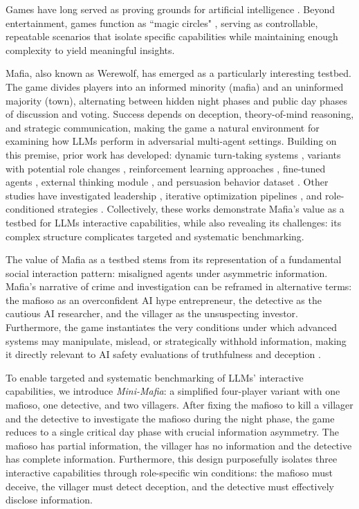 \documentclass{article}
\begin{document}
Games have long served as proving grounds for artificial intelligence \citep{silver2016mastering}. Beyond entertainment, games function as ``magic circles" \citep{huizinga1938homo}, serving as controllable, repeatable scenarios that isolate specific capabilities while maintaining enough complexity to yield meaningful insights.

Mafia, also known as Werewolf, has emerged as a particularly interesting testbed. The game divides players into an informed minority (mafia) and an uninformed majority (town), alternating between hidden night phases and public day phases of discussion and voting. Success depends on deception, theory-of-mind reasoning, and strategic communication, making the game a natural environment for examining how LLMs perform in adversarial multi-agent settings. Building on this premise, prior work has developed: dynamic turn-taking systems \citep{bailis2024werewolfarena}, variants with potential role changes \citep{jin2024onuw}, reinforcement learning approaches \citep{xu2023languageagents}, fine-tuned agents \citep{shibata2023deepwolf}, external thinking module \citep{wu2024thinker}, and persuasion behavior dataset \citep{lai2022werewolfamongus}. Other studies have investigated leadership \citep{du2024helmsman}, iterative optimization pipelines \citep{xu2025lspo}, and role-conditioned strategies \citep{nakamori2025strategy}. Collectively, these works demonstrate Mafia's value as a testbed for LLMs interactive capabilities, while also revealing its challenges: its complex structure complicates targeted and systematic benchmarking.

The value of Mafia as a testbed stems from its representation of  a fundamental social interaction pattern: misaligned agents under asymmetric information. Mafia’s narrative of crime and investigation can be reframed in alternative terms: the mafioso as an overconfident AI hype entrepreneur, the detective as the cautious AI researcher, and the villager as the unsuspecting investor. Furthermore, 
the game instantiates the very conditions under which advanced systems may manipulate, mislead, or strategically withhold information, making it directly relevant to AI safety evaluations of truthfulness and deception \citep{park2023, evans2021truthful}.

To enable targeted and systematic benchmarking of LLMs’ interactive capabilities, we introduce \textit{Mini-Mafia}: a simplified four-player variant with one mafioso, one detective, and two villagers. After fixing the mafioso to kill a villager and the detective to investigate the mafioso during the night phase, the game reduces to a single critical day phase with crucial information asymmetry. The  mafioso has partial information, the villager has no information and the detective has complete information. Furthermore, this design purposefully isolates three interactive capabilities through role-specific win conditions: the mafioso must deceive, the villager must detect deception, and the detective must effectively disclose information.
\end{document}
